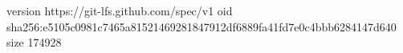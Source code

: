 version https://git-lfs.github.com/spec/v1
oid sha256:e5105c0981c7465a81521469281847912df6889fa41fd7e0c4bbb6284147d640
size 174928
